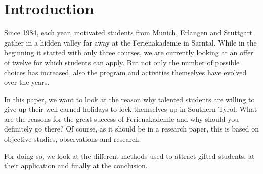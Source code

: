 \section{Introduction}
Since 1984, each year, motivated students from Munich, Erlangen and Stuttgart gather in a hidden valley far away at the Ferienakademie in Sarntal. While in the beginning it started with only three courses, we are currently looking at an offer of twelve for which students can apply. But not only the number of possible choices has increased, also the program and activities themselves have evolved over the years. 

In this paper, we want to look at the reason why talented students are willing to give up their well-earned holidays to lock themselves up in Southern Tyrol. What are the reasons for the great success of Ferienakademie and why should you definitely go there? Of course, as it should be in a research paper, this is based on objective studies, observations and research.

For doing so, we look at the different methods used to attract gifted students, at their application and finally at the conclusion.



